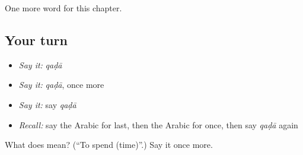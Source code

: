 \begin{grammarlens}[title={What you've built}]
One more word for this chapter.
\end{grammarlens}

\subsection*{Your turn}
\begin{itemize}
\raggedright
  \item \emph{Say it:} \emph{qaḍā}
  \item \emph{Say it:} \emph{qaḍā}, once more
  \item \emph{Say it:} say \emph{qaḍā}
  \item \emph{Recall:} say the Arabic for last, then the Arabic for once, then say \emph{qaḍā} again
\end{itemize}

\begin{tcolorbox}[breakable,colback=teal!4,colframe=teal!35!black,title={Before you move on}]
What does  mean? (\textquotedblleft{}To spend (time)\textquotedblright{}.) Say it once more.
\end{tcolorbox}
